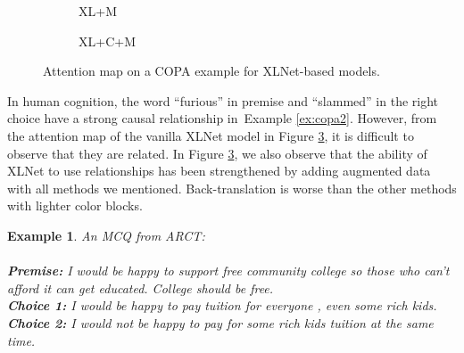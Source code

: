 \documentclass[11pt,a4paper]{article}
\newcommand{\crosssymbol}{{ \XSolidBrush} }
\newcommand{\checksymbol}{{\Checkmark} }
\newtheorem{example}{Example}
\newcommand{\figref}[1]{Figure \ref{#1}}
\newcommand{\exref}[1]{Example \ref{#1}}
\begin{document}
\begin{figure}[th!]
\begin{subfigure}[b]{0.20\textwidth}
\caption{XL+M}
\label{fig:copa2_m}
\end{subfigure}
\hfill
\begin{subfigure}[b]{0.20\textwidth}
\centering
{}
\caption{XL+C+M}
\label{fig:copa2_cm}
\end{subfigure}
\caption{Attention map on a COPA example for XLNet-based models.}
\label{fig:copa2_bert}
\end{figure}

In human cognition, the word ``furious'' in premise and ``slammed'' in the right choice 
have a strong causal relationship in~\exref{ex:copa2}. 
However, from the attention map of the vanilla XLNet model in \figref{fig:copa2_bert}, 
it is difficult to observe that they are related. 
In \figref{fig:copa2_bert}, we also observe that 
the ability of XLNet to use relationships has been strengthened by adding augmented data with all 
methods we mentioned. Back-translation is worse than the other methods with lighter color blocks.

\begin{example}\label{ex:arct1}
An MCQ from ARCT:\\ \\
\noindent
\textbf{Premise:} I would be happy to support free community college so those who can't afford it can get educated. College should be free.\\
\textbf{Choice 1:} I would be happy to pay tuition for everyone , even some rich kids.  \checksymbol \\
\textbf{Choice 2:} I would not be happy to pay for some rich kids tuition at the same time. \crosssymbol
\end{example}
\end{document}
